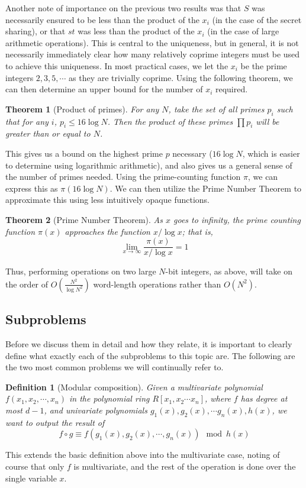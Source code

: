 \documentclass[pageno]{jpaper}
\newtheorem{definition}{Definition}[section]
\newtheorem{theorem}{Theorem}[section]
\begin{document}
Another note of importance on the previous two results was that $S$ was necessarily ensured to be less than the product of the $x_i$ (in the case of the secret sharing), or that $st$ was less than the product of the $x_i$ (in the case of large arithmetic operations).
This is central to the uniqueness, but in general, it is not necessarily immediately clear how many relatively coprime integers must be used to achieve this uniqueness.
In most practical cases, we let the $x_i$ be the prime integers $2, 3, 5, \cdots$ as they are trivially coprime.
Using the following theorem, we can then determine an upper bound for the number of $x_i$ required.
\begin{theorem}[Product of primes]
  For any $N$, take the set of all primes $p_i$ such that for any $i$, $p_i \leq 16\log N$.
  Then the product of these primes $\prod p_i$ will be greater than or equal to $N$.
\end{theorem}
This gives us a bound on the highest prime $p$ necessary ($16\log N$, which is easier to determine using logarithmic arithmetic), and also gives us a general sense of the number of primes needed.
Using the prime-counting function $\pi$, we can express this as $\pi(16\log N)$.
We can then utilize the Prime Number Theorem to approximate this using less intuitively opaque functions.
\begin{theorem}[Prime Number Theorem]
  As $x$ goes to infinity, the prime counting function $\pi(x)$ approaches the function $x/\log x$; that is,
  \[\lim_{x\to\infty} \frac{\pi(x)}{x/\log x} = 1\]
\end{theorem}
Thus, performing operations on two large $N$-bit integers, as above, will take on the order of $O\left(\frac{N^2}{\log N^2}\right)$ word-length operations rather than $O(N^2)$.

\subsection{Subproblems}
Before we discuss them in detail and how they relate, it is important to clearly define what exactly each of the subproblems to this topic are.
The following are the two most common problems we will continually refer to.

\begin{definition}[Modular composition]
  Given a multivariate polynomial $f(x_1, x_2, \cdots, x_n)$ in the polynomial ring $R[x_1, x_2\cdots x_n]$, where $f$ has degree at most $d-1$, and univariate polynomials $g_1(x), g_2(x), \cdots g_n(x), h(x)$, we want to output the result of 
  \[f\circ g \equiv f(g_1(x), g_2(x), \cdots, g_n(x)) \mod h(x)\]
\end{definition}
This extends the basic definition above into the multivariate case, noting of course that only $f$ is multivariate, and the rest of the operation is done over the single variable $x$.
\end{document}
